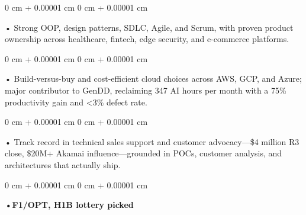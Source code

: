 \documentclass[10pt, letterpaper]{article}
\newenvironment{onecolentry}{
    \begin{adjustwidth}{
        0 cm + 0.00001 cm
    }{
        0 cm + 0.00001 cm
    }
}{
    \end{adjustwidth}
} %
\begin{document}
        \begin{onecolentry}
            • Strong OOP, design patterns, SDLC, Agile, and Scrum, with proven product ownership across healthcare, fintech, edge security, and e-commerce platforms.
        \end{onecolentry}
        \begin{onecolentry}
            • Build-versus-buy and cost-efficient cloud choices across AWS, GCP, and Azure; major contributor to GenDD, reclaiming 347 AI hours per month with a 75\% productivity gain and {<}3\% defect rate.
        \end{onecolentry}
        \begin{onecolentry}
            • Track record in technical sales support and customer advocacy---\$4 million R3 close, \$20M+ Akamai influence---grounded in POCs, customer analysis, and architectures that actually ship.
        \end{onecolentry}
        \begin{onecolentry}
                \textbf{•F1/OPT, H1B lottery picked}
        \end{onecolentry}

    \vspace{2 pt }
\end{document}
